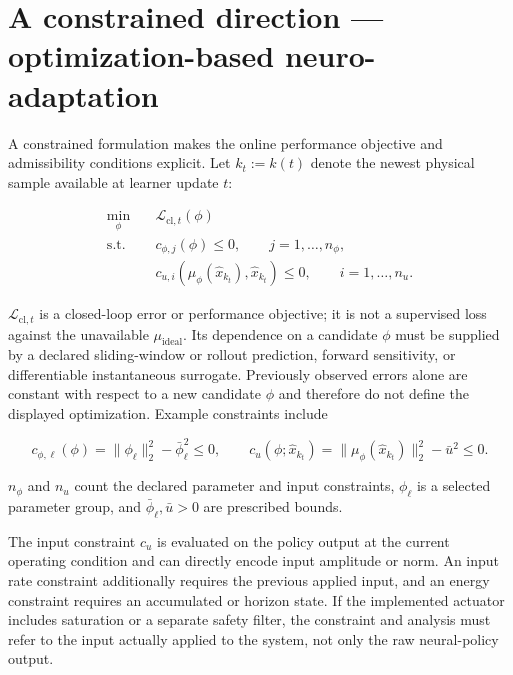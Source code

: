 \documentclass[a4paper]{article}
\begin{document}
\section{A constrained direction — optimization-based neuro-adaptation}

A constrained formulation makes the online performance objective and admissibility conditions explicit. Let $k_t:=k(t)$ denote the newest physical sample available at learner update $t$:

\begin{equation}
  \begin{aligned}
    \min_{\phi}\quad
    &\mathcal L_{\mathrm{cl},t}(\phi)\\
    \text{s.t.}\quad
    &c_{\phi,j}(\phi)\le 0,
    \qquad j=1,\ldots,n_\phi,\\
    &c_{u,i}
    \!\left(
    \mu_\phi(\widehat x_{k_t}),
    \widehat x_{k_t}
    \right)
    \le 0,
    \qquad i=1,\ldots,n_u .
  \end{aligned}
\end{equation}

$\mathcal L_{\mathrm{cl},t}$ is a closed-loop error or performance objective;
it is not a supervised loss against the unavailable
$\mu_{\mathrm{ideal}}$. Its
dependence on a candidate $\phi$ must be supplied by a declared sliding-window
or rollout prediction, forward sensitivity, or differentiable instantaneous
surrogate. Previously observed errors alone are constant with respect to a new
candidate $\phi$ and therefore do not define the displayed optimization.
Example constraints include

\begin{equation}
  c_{\phi,\ell}(\phi)
  =
  \|\phi_\ell\|_2^2-\bar\phi_\ell^2
  \le 0,
  \qquad
  c_u(\phi;\widehat x_{k_t})
  =
  \|\mu_\phi(\widehat x_{k_t})\|_2^2-\bar u^2
  \le 0.
\end{equation}

$n_\phi$ and $n_u$ count the declared parameter and input constraints,
$\phi_\ell$ is a selected parameter group, and
$\bar\phi_\ell,\bar u>0$ are prescribed bounds.

The input constraint $c_u$ is evaluated on the policy output at the current
operating condition and can directly encode input amplitude or norm. An input
rate constraint additionally requires the previous applied input, and an
energy constraint requires an accumulated or horizon state. If the implemented
actuator includes saturation or a separate safety filter, the constraint and
analysis must refer to the input actually applied to the system, not only the
raw neural-policy output.
\end{document}
